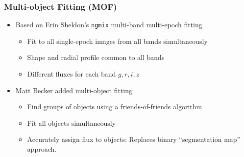 \documentclass{beamer}
\newcommand{\ngmix}{\texttt{ngmix}}
\begin{document}
\frame
{
    \frametitle{Multi-object Fitting (MOF)}

 
    \begin{itemize}

        \item Based on Erin Sheldon's {\color{gold} \ngmix} multi-band multi-epoch fitting
            \begin{itemize}

                \item Fit to all single-epoch images from all bands simultaneously
                \item Shape and radial profile common to all bands
                \item Different fluxes for each band {\color{gold} $g,r,i,z$}

            \end{itemize}

        \item Matt Becker added multi-{\color{gold}object} fitting
            \begin{itemize}
                \item Find groups of objects using a friends-of-friends algorithm
                \item Fit all objects simultaneously
                \item Accurately assign flux to objects:  Replaces binary
                    ``segmentation map'' approach.

            \end{itemize}


    \end{itemize}



}
\end{document}
